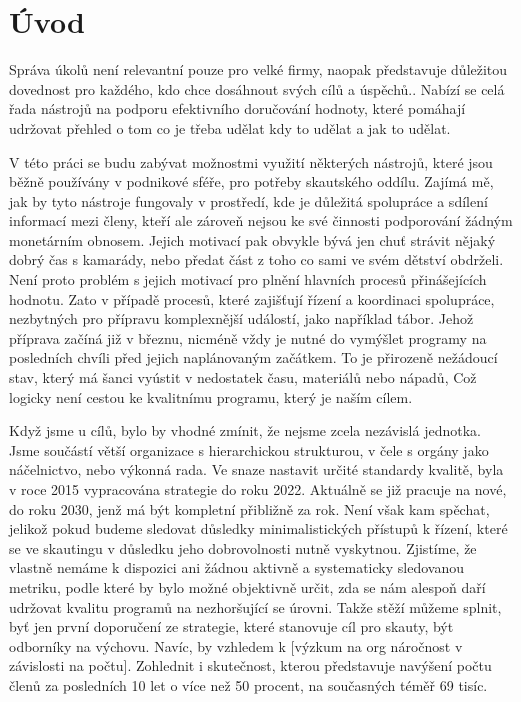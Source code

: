 \chapter*{Úvod}

Správa úkolů není relevantní pouze pro velké firmy, naopak představuje důležitou dovednost pro každého, kdo chce dosáhnout svých cílů a úspěchů.. Nabízí se celá řada nástrojů na podporu efektivního doručování hodnoty, které pomáhají udržovat přehled o tom co je třeba udělat kdy to udělat a jak to udělat. 

V této práci se budu zabývat možnostmi využití některých nástrojů, které jsou běžně používány v podnikové sféře, pro potřeby skautského oddílu. Zajímá mě, jak by tyto nástroje fungovaly v prostředí, kde je důležitá spolupráce a sdílení informací mezi členy, kteří ale zároveň nejsou ke své činnosti podporování žádným monetárním obnosem. Jejich motivací pak obvykle bývá jen chuť strávit nějaký dobrý čas s kamarády, nebo předat část z toho co sami ve svém dětství obdrželi. Není proto problém s jejich motivací pro plnění hlavních procesů přinášejících hodnotu. Zato v případě procesů, které zajišťují řízení a koordinaci spolupráce, nezbytných pro přípravu komplexnější událostí, jako například tábor. Jehož příprava začíná již v březnu, nicméně vždy je nutné do vymýšlet programy na posledních chvíli před jejich naplánovaným začátkem. To je přirozeně nežádoucí stav, který má šanci vyústit v nedostatek času, materiálů nebo nápadů, Což logicky není cestou ke kvalitnímu programu, který je naším cílem. 

Když jsme u cílů, bylo by vhodné zmínit, že nejsme zcela nezávislá jednotka. Jsme součástí větší organizace s hierarchickou strukturou, v čele s orgány jako náčelnictvo, nebo výkonná rada. Ve snaze nastavit určité standardy kvalitě, byla v roce 2015 vypracována strategie do roku 2022. Aktuálně se již pracuje na nové, do roku 2030, jenž má být kompletní přibližně za rok. Není však kam spěchat, jelikož pokud budeme sledovat důsledky minimalistických přístupů k řízení, které se ve skautingu v důsledku jeho dobrovolnosti nutně vyskytnou. Zjistíme, že vlastně nemáme k dispozici ani žádnou aktivně a systematicky sledovanou metriku, podle které by bylo možné objektivně určit, zda se nám alespoň daří udržovat kvalitu programů na nezhoršující se úrovni. Takže stěží můžeme splnit, byť jen první doporučení ze strategie, které stanovuje cíl pro skauty, být odborníky na výchovu. Navíc, by vzhledem k [výzkum na org náročnost v závislosti na počtu]. Zohlednit i skutečnost, kterou představuje navýšení počtu členů za posledních 10 let o více než 50 procent, na současných téměř 69 tisíc.  

